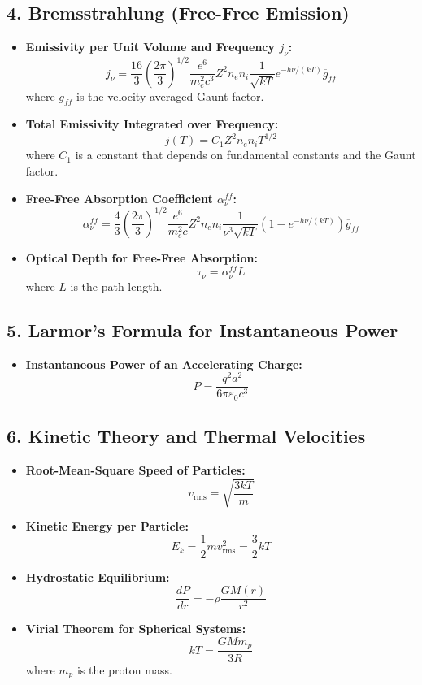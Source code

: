 \documentclass{article}
\begin{document}
\subsection*{4. Bremsstrahlung (Free-Free Emission)}

\begin{itemize}
    \item \textbf{Emissivity per Unit Volume and Frequency \( j_\nu \):}
          \[
              j_\nu = \frac{16}{3} \left( \frac{2\pi}{3} \right)^{1/2} \frac{e^6}{m_e^2 c^3} Z^2 n_e n_i \frac{1}{\sqrt{k T}} e^{-h\nu/(kT)} \overline{g}_{ff}
          \]
          where \( \overline{g}_{ff} \) is the velocity-averaged Gaunt factor.
    \item \textbf{Total Emissivity Integrated over Frequency:}
          \[
              j(T) = C_1 Z^2 n_e n_i T^{1/2}
          \]
          where \( C_1 \) is a constant that depends on fundamental constants and the Gaunt factor.
    \item \textbf{Free-Free Absorption Coefficient \( \alpha_\nu^{ff} \):}
          \[
              \alpha_\nu^{ff} = \frac{4}{3} \left( \frac{2\pi}{3} \right)^{1/2} \frac{e^6}{m_e^2 c} Z^2 n_e n_i \frac{1}{\nu^3 \sqrt{k T}} \left(1 - e^{-h\nu/(kT)}\right) \overline{g}_{ff}
          \]
    \item \textbf{Optical Depth for Free-Free Absorption:}
          \[
              \tau_\nu = \alpha_\nu^{ff} L
          \]
          where \( L \) is the path length.
\end{itemize}

\subsection*{5. Larmor's Formula for Instantaneous Power}

\begin{itemize}
    \item \textbf{Instantaneous Power of an Accelerating Charge:}
          \[
              P = \frac{q^2 a^2}{6\pi \varepsilon_0 c^3}
          \]
\end{itemize}

\subsection*{6. Kinetic Theory and Thermal Velocities}

\begin{itemize}
    \item \textbf{Root-Mean-Square Speed of Particles:}
          \[
              v_{\text{rms}} = \sqrt{\frac{3 k T}{m}}
          \]
    \item \textbf{Kinetic Energy per Particle:}
          \[
              E_k = \frac{1}{2} m v_{\text{rms}}^2 = \frac{3}{2} k T
          \]
    \item \textbf{Hydrostatic Equilibrium:}
          \[
              \frac{dP}{dr} = -\rho \frac{G M(r)}{r^2}
          \]
    \item \textbf{Virial Theorem for Spherical Systems:}
          \[
              k T = \frac{G M m_p}{3 R}
          \]
          where \( m_p \) is the proton mass.
\end{itemize}
\end{document}
